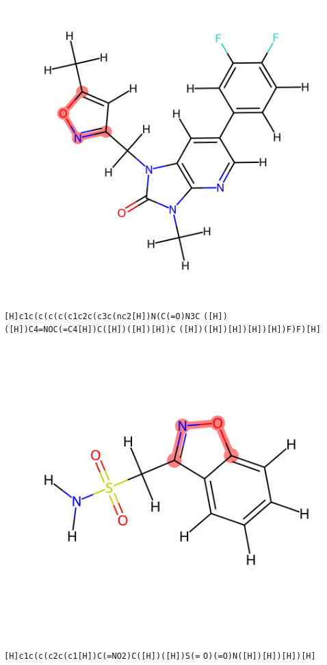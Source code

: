 \documentclass{article}
\begin{document}
\begin{figure}[ht]
\centering
    \includegraphics{mol32.png}
\end{figure}
\verb|[H]c1c(c(c(c(c1c2c(c3c(nc2[H])N(C(=O)N3C| \verb|([H])([H])C4=NOC(=C4[H])C([H])([H])[H])C| \verb|([H])([H])[H])[H])[H])F)F)[H]|

\begin{figure}[ht]
\centering
    \includegraphics{mol33.png}
\end{figure}
\verb|[H]c1c(c(c2c(c1[H])C(=NO2)C([H])([H])S(=| \verb|O)(=O)N([H])[H])[H])[H]|
\end{document}
